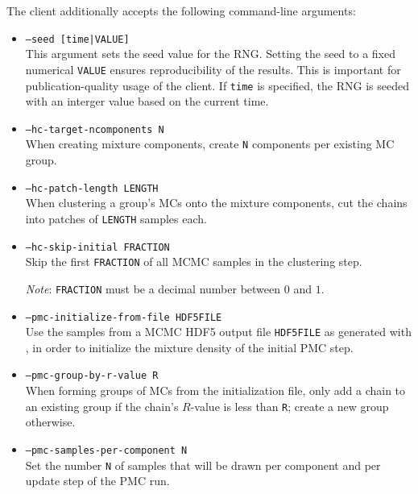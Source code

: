 The  client additionally accepts the following command-line arguments:
\begin{itemize}
    \item[] \texttt{--seed [time|VALUE]}\\[\medskipamount]
        This argument sets the seed value for the \gls{RNG}. Setting the
        seed to a fixed numerical \texttt{VALUE} ensures reproducibility of the results. This
        is important for publication-quality usage of the client. If \texttt{time} is
        specified, the \gls{RNG} is seeded with an interger value based on the current time.

    \item[] \texttt{--hc-target-ncomponents N}\\[\medskipamount]
        When creating mixture components, create \texttt{N} components per existing
        MC group.

    \item[] \texttt{--hc-patch-length LENGTH}\\[\medskipamount]
        When clustering a group's MCs onto the mixture components, cut the
        chains into patches of \texttt{LENGTH} samples each.

    \item[] \texttt{--hc-skip-initial FRACTION}\\[\medskipamount]
        Skip the first \texttt{FRACTION} of all MCMC samples in the clustering step.

        \emph{Note}: \texttt{FRACTION} must be a decimal number between $0$ and $1$.

    \item[] \texttt{--pmc-initialize-from-file HDF5FILE}\\[\medskipamount]
        Use the samples from a MCMC HDF5 output file \texttt{HDF5FILE} as
        generated with , in order to initialize the
        mixture density of the initial PMC step.

    \item[] \texttt{--pmc-group-by-r-value R}\\[\medskipamount]
        When forming groups of MCs from the initialization file, only add
        a chain to an existing group if the chain's $R$-value is less than \texttt{R};
        create a new group otherwise.

    \item[] \texttt{--pmc-samples-per-component N}\\[\medskipamount]
        Set the number \texttt{N} of samples that will be drawn per component and
        per update step of the PMC run.


\end{itemize}
